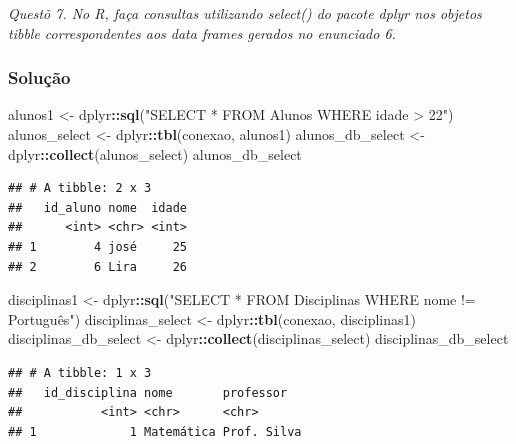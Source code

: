 \documentclass[
]{article}
\newenvironment{Shaded}{\begin{snugshade}}{\end{snugshade}}
\newcommand{\FunctionTok}[1]{\textcolor[rgb]{0.13,0.29,0.53}{\textbf{#1}}}
\newcommand{\NormalTok}[1]{#1}
\newcommand{\OtherTok}[1]{\textcolor[rgb]{0.56,0.35,0.01}{#1}}
\newcommand{\SpecialCharTok}[1]{\textcolor[rgb]{0.81,0.36,0.00}{\textbf{#1}}}
\newcommand{\StringTok}[1]{\textcolor[rgb]{0.31,0.60,0.02}{#1}}
\begin{document}
\emph{Questõ 7. No R, faça consultas utilizando select() do pacote dplyr
nos objetos tibble correspondentes aos data frames gerados no enunciado
6.}

\subsubsection{Solução}\label{soluuxe7uxe3o-6}

\begin{Shaded}
\begin{Highlighting}[]
\NormalTok{alunos1 }\OtherTok{\textless{}{-}}\NormalTok{ dplyr}\SpecialCharTok{::}\FunctionTok{sql}\NormalTok{(}\StringTok{"SELECT * FROM Alunos WHERE idade \textgreater{} 22"}\NormalTok{)}
\NormalTok{alunos\_select }\OtherTok{\textless{}{-}}\NormalTok{ dplyr}\SpecialCharTok{::}\FunctionTok{tbl}\NormalTok{(conexao, alunos1)}
\NormalTok{alunos\_db\_select }\OtherTok{\textless{}{-}}\NormalTok{ dplyr}\SpecialCharTok{::}\FunctionTok{collect}\NormalTok{(alunos\_select)}
\NormalTok{alunos\_db\_select}
\end{Highlighting}
\end{Shaded}

\begin{verbatim}
## # A tibble: 2 x 3
##   id_aluno nome  idade
##      <int> <chr> <int>
## 1        4 josé     25
## 2        6 Lira     26
\end{verbatim}

\begin{Shaded}
\begin{Highlighting}[]
\NormalTok{disciplinas1 }\OtherTok{\textless{}{-}}\NormalTok{ dplyr}\SpecialCharTok{::}\FunctionTok{sql}\NormalTok{(}\StringTok{"SELECT * FROM Disciplinas WHERE nome != \textquotesingle{}Português\textquotesingle{}"}\NormalTok{)}
\NormalTok{disciplinas\_select }\OtherTok{\textless{}{-}}\NormalTok{ dplyr}\SpecialCharTok{::}\FunctionTok{tbl}\NormalTok{(conexao, disciplinas1)}
\NormalTok{disciplinas\_db\_select }\OtherTok{\textless{}{-}}\NormalTok{ dplyr}\SpecialCharTok{::}\FunctionTok{collect}\NormalTok{(disciplinas\_select)}
\NormalTok{disciplinas\_db\_select}
\end{Highlighting}
\end{Shaded}

\begin{verbatim}
## # A tibble: 1 x 3
##   id_disciplina nome       professor  
##           <int> <chr>      <chr>      
## 1             1 Matemática Prof. Silva
\end{verbatim}
\end{document}
